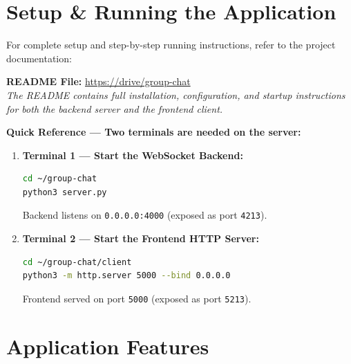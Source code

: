 \documentclass[11pt,a4paper]{article}
\begin{document}

\section{Setup \& Running the Application}

For complete setup and step-by-step running instructions, refer to the project documentation:

\begin{mdframed}[
    backgroundcolor=codebg,
    linecolor=bordercolor,
    linewidth=1pt,
    roundcorner=4pt,
    innertopmargin=8pt,
    innerbottommargin=8pt
]
    \centering
    \textbf{README File:} \url{https://drive/group-chat}\\[4pt]
    \textit{The README contains full installation, configuration, and startup instructions for both the backend server and the frontend client.}
\end{mdframed}

\vspace{0.3cm}

\textbf{Quick Reference --- Two terminals are needed on the server:}

\begin{enumerate}[itemsep=4pt]
    \item \textbf{Terminal 1 --- Start the WebSocket Backend:}
    \begin{lstlisting}[language=bash]
cd ~/group-chat
python3 server.py
    \end{lstlisting}
    Backend listens on \texttt{0.0.0.0:4000} (exposed as port \texttt{4213}).

    \item \textbf{Terminal 2 --- Start the Frontend HTTP Server:}
    \begin{lstlisting}[language=bash]
cd ~/group-chat/client
python3 -m http.server 5000 --bind 0.0.0.0
    \end{lstlisting}
    Frontend served on port \texttt{5000} (exposed as port \texttt{5213}).
\end{enumerate}


\section{Application Features}
\end{document}
